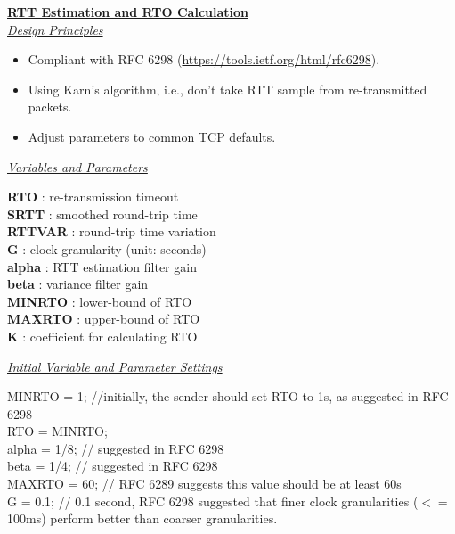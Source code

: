 \documentclass[10pt]{article}
\begin{document}
\vspace{1em}
\underline{\textbf{RTT Estimation and RTO Calculation}}\\

\underline{\emph{Design Principles}}

\begin{itemize}[noitemsep]
\item Compliant with RFC 6298
  (\url{https://tools.ietf.org/html/rfc6298}).
\item Using Karn's algorithm, i.e., don't take RTT sample from
  re-transmitted packets.
\item Adjust parameters to common TCP defaults.
\end{itemize}

\underline{\emph{Variables and Parameters}}
\begin{mdframed}
  \textbf{RTO} : re-transmission timeout\\
  \textbf{SRTT} : smoothed round-trip time\\
  \textbf{RTTVAR} : round-trip time variation\\
  \textbf{G} : clock granularity (unit: seconds)\\
  \textbf{alpha} : RTT estimation filter gain\\
  \textbf{beta} : variance filter gain\\
  \textbf{MINRTO} : lower-bound of RTO\\
  \textbf{MAXRTO} : upper-bound of RTO\\
  \textbf{K} : coefficient for calculating RTO\\
\end{mdframed}

\underline{\emph{Initial Variable and Parameter Settings}}
\begin{mdframed}
  MINRTO = 1; //initially, the sender should set RTO to 1s, as suggested
  in RFC 6298\\
  RTO = MINRTO;\\
  alpha = 1/8; // suggested in RFC 6298\\
  beta = 1/4; // suggested in RFC 6298\\
  MAXRTO = 60; // RFC 6289 suggests this value should be at least 60s\\
  G = 0.1; // 0.1 second, RFC 6298 suggested that finer clock
  granularities ($<=$ 100ms) perform better than coarser
  granularities.
\end{mdframed}
\end{document}
